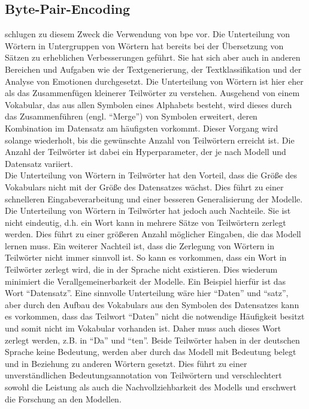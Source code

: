 \subsection{Byte-Pair-Encoding}\label{subsec:bpe}
\citet{bpe} schlugen zu diesem Zweck die Verwendung von \ac{bpe} vor.
Die Unterteilung von Wörtern in Untergruppen von Wörtern hat bereits bei der Übersetzung von Sätzen zu erheblichen Verbesserungen geführt. Sie hat sich aber auch in anderen Bereichen und Aufgaben wie der Textgenerierung, der Textklassifikation und der Analyse von Emotionen durchgesetzt.
Die Unterteilung von Wörtern ist hier eher als das Zusammenfügen kleinerer Teilwörter zu verstehen.
Ausgehend von einem Vokabular, das aus allen Symbolen eines Alphabets besteht, wird dieses durch das Zusammenführen (engl. \enquote{Merge}) von Symbolen erweitert, deren Kombination im Datensatz am häufigsten vorkommt.
Dieser Vorgang wird solange wiederholt, bis die gewünschte Anzahl von Teilwörtern erreicht ist.
Die Anzahl der Teilwörter ist dabei ein Hyperparameter, der je nach Modell und Datensatz variiert.\\

Die Unterteilung von Wörtern in Teilwörter hat den Vorteil, dass die Größe des Vokabulars nicht mit der Größe des Datensatzes wächst.
Dies führt zu einer schnelleren Eingabeverarbeitung und einer besseren Generalisierung der Modelle.
Die Unterteilung von Wörtern in Teilwörter hat jedoch auch Nachteile. Sie ist nicht eindeutig, d.h. ein Wort kann in mehrere Sätze von Teilwörtern zerlegt werden.
Dies führt zu einer größeren Anzahl möglicher Eingaben, die das Modell lernen muss.
Ein weiterer Nachteil ist, dass die Zerlegung von Wörtern in Teilwörter nicht immer sinnvoll ist.
So kann es vorkommen, dass ein Wort in Teilwörter zerlegt wird, die in der Sprache nicht existieren.
Dies wiederum minimiert die Verallgemeinerbarkeit der Modelle.
Ein Beispiel hierfür ist das Wort \enquote{Datensatz}.
Eine sinnvolle Unterteilung wäre hier \enquote{Daten} und \enquote{satz}, aber durch den Aufbau des Vokabulars aus den Symbolen des Datensatzes kann es vorkommen, dass das Teilwort \enquote{Daten} nicht die notwendige Häufigkeit besitzt und somit nicht im Vokabular vorhanden ist.
Daher muss auch dieses Wort zerlegt werden, z.B. in \enquote{Da} und \enquote{ten}.
Beide Teilwörter haben in der deutschen Sprache keine Bedeutung, werden aber durch das Modell mit Bedeutung belegt und in Beziehung zu anderen Wörtern gesetzt.
Dies führt zu einer unverständlichen Bedeutungsannotation von Teilwörtern und verschlechtert sowohl die Leistung als auch die Nachvollziehbarkeit des Modells und erschwert die Forschung an den Modellen. 

